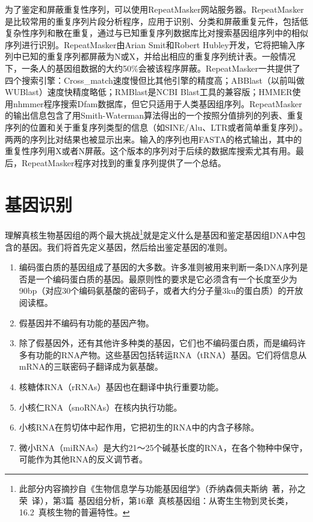 \documentclass[11pt,a4paper,twoside]{book}
\begin{document}
为了鉴定和屏蔽重复性序列，可以使用RepeatMasker网站服务器。RepeatMasker是比较常用的重复序列片段分析程序，应用于识别、分类和屏蔽重复元件，包括低复杂性序列和散在重复，通过与已知重复序列数据库比对搜索基因组序列中的相似序列进行识别。RepeatMasker由Arian Smit和Robert Hubley开发，它将把输入序列中已知的重复序列都屏蔽为N或X，并给出相应的重复序列统计表。一般情况下，一条人的基因组数据的大约50\%会被该程序屏蔽。RepeatMasker一共提供了四个搜索引擎：Cross\_match速度慢但比其他引擎的精度高；ABBlast（以前叫做WUBlast）速度快精度略低；RMBlast是NCBI Blast工具的兼容版；HMMER使用nhmmer程序搜索Dfam数据库，但它只适用于人类基因组序列。RepeatMasker的输出信息包含了用Smith-Waterman算法得出的一个按照分值排列的列表、重复序列的位置和关于重复序列类型的信息（如SINE/Alu、LTR或者简单重复序列）。两两的序列比对结果也被显示出来。输入的序列也用FASTA的格式输出，其中的重复性序列用X或者N屏蔽。这个版本的序列对于后续的数据库搜索尤其有用。最后，RepeatMasker程序对找到的重复序列提供了一个总结。

\section{基因识别}
理解真核生物基因组的两个最大挑战\footnote{此部分内容摘抄自《生物信息学与功能基因组学》（乔纳森\textbullet 佩夫斯纳\ 著，孙之荣\ 译），第3篇\ 基因组分析，第16章\ 真核基因组：从寄生生物到灵长类，16.2\ 真核生物的普遍特性。}就是定义什么是基因和鉴定基因组DNA中包含的基因。我们将首先定义基因，然后给出鉴定基因的准则。
\begin{enumerate}
  \item
    编码蛋白质的基因组成了基因的大多数。许多准则被用来判断一条DNA序列是否是一个编码蛋白质的基因。最原则性的要求是它必须含有一个长度至少为90bp（对应30个编码氨基酸的密码子，或者大约分子量3ku的蛋白质）的开放阅读框。
  \item 假基因并不编码有功能的基因产物。
  \item
    除了假基因外，还有其他许多种类的基因，它们也不编码蛋白质，而是编码许多有功能的RNA产物。这些基因包括转运RNA（tRNA）基因。它们将信息从mRNA的三联密码子翻译成为氨基酸。
  \item 核糖体RNA（rRNAs）基因也在翻译中执行重要功能。
  \item 小核仁RNA（snoRNAs）在核内执行功能。
  \item 小核RNA在剪切体中起作用，它把初生的RNA中的内含子移除。
  \item 微小RNA（miRNAs）是大约21～25个碱基长度的RNA，在各个物种中保守，可能作为其他RNA的反义调节者。
\end{enumerate}
\end{document}
